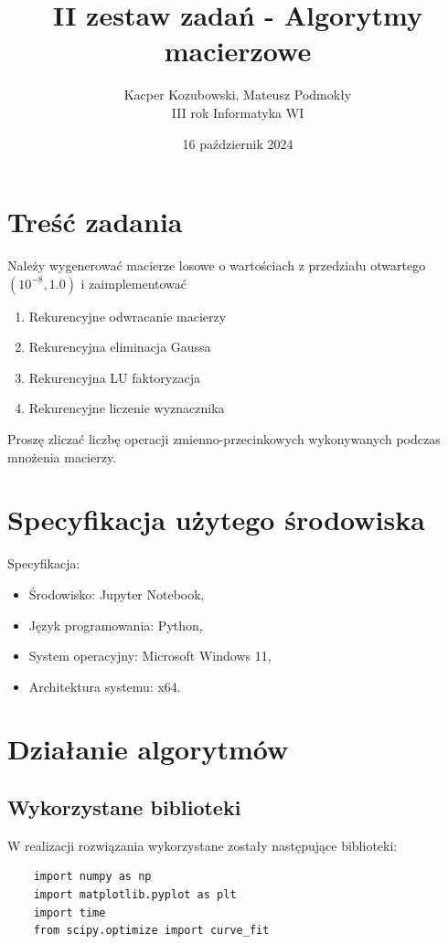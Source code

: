 \documentclass[11pt, leqno]{scrartcl}
\title{II zestaw zadań - Algorytmy macierzowe}
\author{Kacper Kozubowski, Mateusz Podmokły \\ III
    rok Informatyka WI}
\date{16 październik 2024}
\begin{document}
    \maketitle
    \section{Treść zadania}
    Należy wygenerować macierze losowe o wartościach
    z przedziału otwartego $(10^{-8},1.0)$
    i zaimplementować
    \begin{enumerate}
        \item Rekurencyjne odwracanie macierzy
        \item Rekurencyjna eliminacja Gaussa
        \item Rekurencyjna LU faktoryzacja
        \item Rekurencyjne liczenie wyznacznika
    \end{enumerate}
    Proszę zliczać liczbę operacji zmienno-przecinkowych
    wykonywanych podczas mnożenia macierzy.

    \section{Specyfikacja użytego środowiska}
    Specyfikacja:
    \begin{itemize}
        \item Środowisko: Jupyter Notebook,
        \item Język programowania: Python,
        \item System operacyjny: Microsoft Windows 11,
        \item Architektura systemu: x64.
    \end{itemize}

    \section{Działanie algorytmów}
    \subsection{Wykorzystane biblioteki}
    W realizacji rozwiązania wykorzystane zostały następujące
    biblioteki:
    \begin{lstlisting}
    import numpy as np
    import matplotlib.pyplot as plt
    import time
    from scipy.optimize import curve_fit
    \end{lstlisting}
\end{document}
